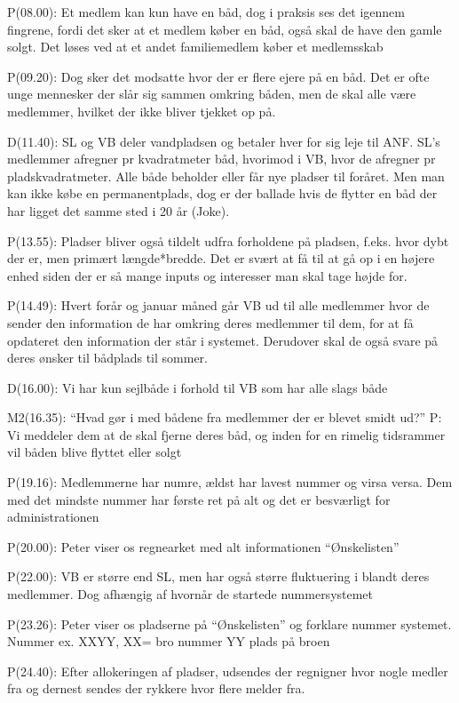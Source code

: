 \documentclass{article}
\begin{document}
P(08.00): Et medlem kan kun have en båd, dog i praksis ses det igennem fingrene, fordi det sker at et medlem køber en båd, også skal de have den gamle solgt. Det løses ved at et andet familiemedlem køber et medlemsskab

P(09.20): Dog sker det modsatte hvor der er flere ejere på en båd. Det er ofte unge mennesker der slår sig sammen omkring båden, men de skal alle være medlemmer, hvilket der ikke bliver tjekket op på.

D(11.40): SL og VB deler vandpladsen og betaler hver for sig leje til ANF. SL's medlemmer afregner pr kvadratmeter båd, hvorimod i VB, hvor de afregner pr pladskvadratmeter. Alle både beholder eller får nye pladser til foråret. Men man kan ikke købe en permanentplads, dog er der ballade hvis de flytter en båd der har ligget det samme sted i 20 år (Joke).

P(13.55): Pladser bliver også tildelt udfra forholdene på pladsen, f.eks. hvor dybt der er, men primært længde*bredde. Det er svært at få til at gå op i en højere enhed siden der er så mange inputs og interesser man skal tage højde for.

P(14.49): Hvert forår og januar måned går VB ud til alle medlemmer hvor de sender den information de har omkring deres medlemmer til dem, for at få opdateret den information der står i systemet. Derudover skal de også svare på deres ønsker til bådplads til sommer. 

D(16.00): Vi har kun sejlbåde i forhold til VB som har alle slags både

M2(16.35): “Hvad gør i med bådene fra medlemmer der er blevet smidt ud?”
P: Vi meddeler dem at de skal fjerne deres båd, og inden for en rimelig tidsrammer vil båden blive flyttet eller solgt

P(19.16): Medlemmerne har numre, ældst har lavest nummer og virsa versa. Dem med det mindste nummer har første ret på alt og det er besværligt for administrationen

P(20.00): Peter viser os regnearket med alt informationen “Ønskelisten”

P(22.00): VB er større end SL, men har også større fluktuering i blandt deres medlemmer. Dog afhængig af hvornår de startede nummersystemet

P(23.26): Peter viser os pladserne på “Ønskelisten” og forklare nummer systemet. Nummer ex. XXYY, XX= bro nummer YY plads på broen

P(24.40): Efter allokeringen af pladser, udsendes der regnigner hvor nogle medler fra og dernest sendes der rykkere hvor flere melder fra.
\end{document}

